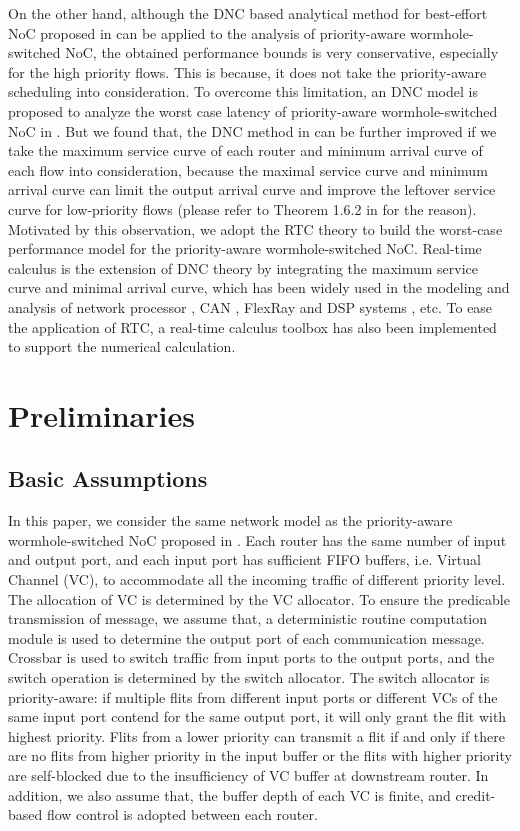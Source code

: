 \documentclass[10pt,journal]{IEEEtran}
\begin{document}
On the other hand, although the DNC based analytical method for best-effort NoC proposed in \cite{qian2009analysis} can be applied to the analysis of priority-aware wormhole-switched NoC, the obtained performance bounds is very conservative, especially for the high priority flows. This is because, it does not take the priority-aware scheduling into consideration. To overcome this limitation, an DNC model is proposed to analyze the worst case latency of priority-aware wormhole-switched NoC in \cite{Qian489900}. But we found that, the DNC method in \cite{Qian489900} can be further improved if we take the maximum service curve of each router and minimum arrival curve of each flow into consideration, because the maximal service curve and minimum arrival curve can limit the output arrival curve and improve the leftover service curve for low-priority flows (please refer to Theorem 1.6.2 in \cite{Boudec2001Network} for the reason). Motivated by this observation, we adopt the RTC theory \cite{1253607} to build the worst-case performance model for the priority-aware wormhole-switched NoC. Real-time calculus is the extension of DNC theory by integrating the maximum service curve and minimal arrival curve, which has been widely used in the modeling and analysis of network processor \cite{1253838}, CAN \cite{4617308}, FlexRay \cite{Hagiescu:2007:PAF:1278480.1278554} and DSP systems \cite{thiele2005performance}, etc. To ease the application of RTC, a real-time calculus toolbox \cite{rtc} has also been implemented to support the numerical calculation.

\section{Preliminaries}\label{model}
\subsection{Basic Assumptions}
In this paper, we consider the same network model as the priority-aware wormhole-switched NoC proposed in \cite{627905}\cite{Shi:2008:RCA:1397757.1397996}\cite{707545}\cite{73}. Each router has the same number of input and output port, and each input port has sufficient FIFO buffers, i.e. Virtual Channel (VC), to accommodate all the incoming traffic of different priority level. The allocation of VC is determined by the VC allocator. To ensure the predicable transmission of message, we assume that, a deterministic routine computation module is used to determine the output port of each communication message. Crossbar is used to switch traffic from input ports to the output ports, and the switch operation is determined by the switch allocator. The switch allocator is priority-aware: if multiple flits from different input ports or different VCs of the same input port contend for the same output port, it will only grant the flit with highest priority. Flits from a lower priority can transmit a flit if and only if there are no flits from higher priority in the input buffer or the flits with higher priority are self-blocked due to the insufficiency of VC buffer at downstream router. In addition, we also assume that, the buffer depth of each VC is finite, and credit-based flow control is adopted between each router.
\end{document}
